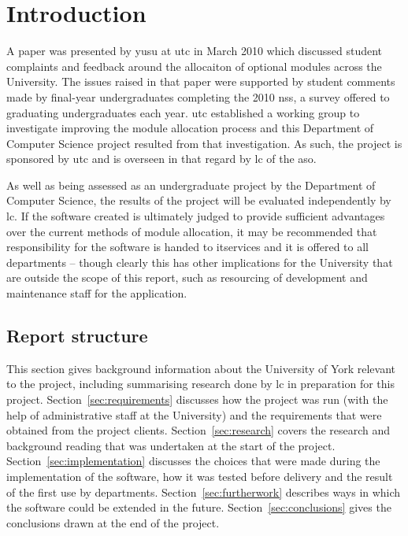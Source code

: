 
\section{Introduction}


A paper was presented by \gls{yusu} at \gls{utc} in March 2010 which discussed
student complaints and feedback around the allocaiton of optional modules
across the University. The issues raised in that paper were supported by
student comments made by final-year undergraduates completing the 2010
\gls{nss}, a survey offered to graduating undergraduates each year. \gls{utc}
established a working group to investigate improving the module allocation
process and this Department of Computer Science project resulted from that
investigation. As such, the project is sponsored by \gls{utc} and is overseen
in that regard by \gls{lc} of the \gls{aso}.

As well as being assessed as an undergraduate project by the Department of
Computer Science, the results of the project will be evaluated independently
by \gls{lc}. If the software created is ultimately judged to provide
sufficient advantages over the current methods of module allocation, it may be
recommended that responsibility for the software is handed to \gls{itservices}
and it is offered to all departments -- though clearly this has other
implications for the University that are outside the scope of this report,
such as resourcing of development and maintenance staff for the application.

\subsection{Report structure}

This section gives background information about the University of York
relevant to the project, including summarising research done by \gls{lc} in
preparation for this project. Section~\ref{sec:requirements} discusses how the
project was run (with the help of administrative staff at the University) and
the requirements that were obtained from the project clients.
Section~\ref{sec:research} covers the research and background reading that was
undertaken at the start of the project. Section~\ref{sec:implementation}
discusses the choices that were made during the implementation of the
software, how it was tested before delivery and the result of the first use by
departments. Section~\ref{sec:furtherwork} describes ways in which the
software could be extended in the future. Section~\ref{sec:conclusions} gives
the conclusions drawn at the end of the project.


